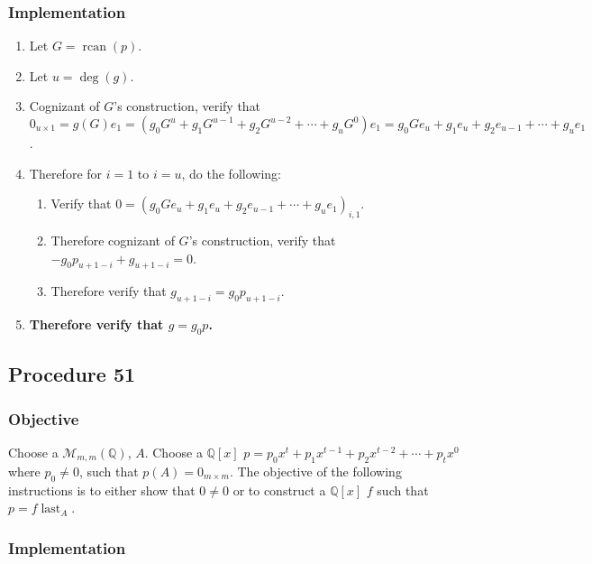 \documentclass[twocolumn]{article}
\DeclareMathOperator{\rcan}{rcan}
\DeclareMathOperator{\last}{last}
\newcommand{\procedure}[2][]{\subsection*{Procedure #2 \ifthenelse{\equal{#1}{}}{}{(#1)}}\label{sec:procedure #2}}
\newcommand{\objective}{\subsubsection*{Objective}}
\newcommand{\implementation}{\subsubsection*{Implementation}}
\begin{document}
			\implementation
				\begin{enumerate}
					\item Let $G=\rcan(p)$.
					\item Let $u=\deg(g)$.
					\item Cognizant of $G$'s construction, verify that $0_{u\times 1}=g(G)e_1=(g_0G^u+g_1G^{u-1}+g_2G^{u-2}+\cdots+g_uG^0)e_1=g_0Ge_u+g_1e_u+g_2e_{u-1}+\cdots+g_ue_1$.
					\item Therefore for $i=1$ to $i=u$, do the following:
					\begin{enumerate}
						\item Verify that $0=(g_0Ge_u+g_1e_u+g_2e_{u-1}+\cdots+g_ue_1)_{i,1}$.
						\item Therefore cognizant of $G$'s construction, verify that $-g_0p_{u+1-i}+g_{u+1-i}=0$.
						\item Therefore verify that $g_{u+1-i}=g_0p_{u+1-i}$.
					\end{enumerate}
					\item \textbf{Therefore verify that $g=g_0p$.}
				\end{enumerate}
		\procedure{51}
			\objective
				Choose a $\mathcal{M}_{m,m}(\mathbb{Q})$, $A$. Choose a $\mathbb{Q}[x]$ $p=p_0x^t+p_1x^{t-1}+p_2x^{t-2}+\cdots+p_tx^0$ where $p_0\ne 0$, such that $p(A)=0_{m\times m}$. The objective of the following instructions is to either show that $0\ne 0$ or to construct a $\mathbb{Q}[x]$ $f$ such that $p=f\last_A$.
			\implementation
\end{document}
